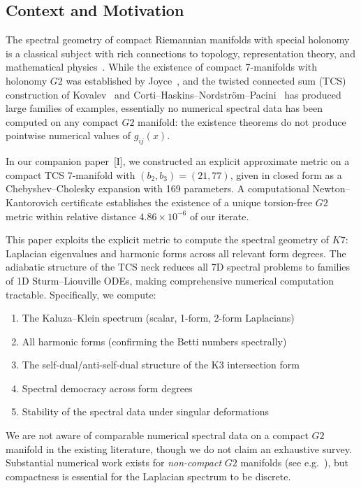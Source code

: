 \documentclass[11pt,a4paper]{article}
\newcommand{\Gtwo}{\mathrm{G}_2}
\newcommand{\Kseven}{K_7}
\theoremstyle{remark}
\def\Gtwo{G2}%
\def\Kseven{K7}%
\begin{document}
\subsection{Context and Motivation}

The spectral geometry of compact Riemannian manifolds with special holonomy is a
classical subject with rich connections to topology, representation theory, and
mathematical physics~\cite{ref13,ref14,ref15}. While the existence of compact 7-manifolds with
holonomy $\Gtwo$ was established by Joyce~\cite{ref5,ref6}, and the twisted connected sum (TCS)
construction of Kovalev~\cite{ref7} and Corti--Haskins--Nordstr\"om--Pacini~\cite{ref8} has produced
large families of examples, essentially no numerical spectral data has been computed
on any compact $\Gtwo$ manifold: the existence theorems do not produce pointwise
numerical values of $g_{ij}(x)$.

In our companion paper~[I], we constructed an explicit approximate metric on a
compact TCS 7-manifold with $(b_2, b_3) = (21, 77)$, given in closed form as a
Chebyshev--Cholesky expansion with 169 parameters. A computational Newton--Kantorovich
certificate establishes the existence of a unique torsion-free $\Gtwo$ metric within
relative distance $4.86 \times 10^{-6}$ of our iterate.

This paper exploits the explicit metric to compute the spectral geometry of $\Kseven$:
Laplacian eigenvalues and harmonic forms across all relevant form degrees. The
adiabatic structure of the TCS neck reduces all 7D spectral problems to families of
1D Sturm--Liouville ODEs, making comprehensive numerical computation tractable.
Specifically, we compute:

\begin{enumerate}
\item The Kaluza--Klein spectrum (scalar, 1-form, 2-form Laplacians)
\item All harmonic forms (confirming the Betti numbers spectrally)
\item The self-dual/anti-self-dual structure of the K3 intersection form
\item Spectral democracy across form degrees
\item Stability of the spectral data under singular deformations
\end{enumerate}

We are not aware of comparable numerical spectral data on a compact $\Gtwo$
manifold in the existing literature, though we do not claim an exhaustive
survey. Substantial numerical work exists for \textit{non-compact} $\Gtwo$
manifolds (see e.g.~\cite{ref9,ref10}), but compactness is essential for the
Laplacian spectrum to be discrete.
\end{document}
